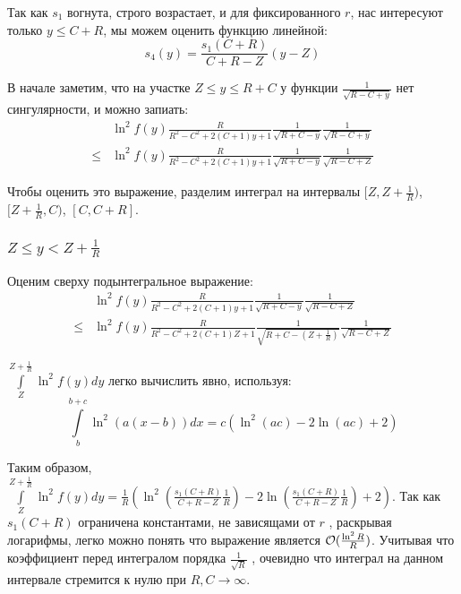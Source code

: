 Так как $s_1$ вогнута, строго возрастает, и для фиксированного $r$, нас интересуют только $y \le C + R$, мы можем оценить функцию линейной: %
\[
s_4(y) = 
\frac{s_1(C + R)}{C + R - Z} (y - Z) %
\]


В начале заметим, что на участке $Z \le y \le R + C$ у функции $\frac{1}{\sqrt{R - C + y}}$ нет сингулярности, и можно запиать:
\begin{align*}
       & \ln^2 f(y) \frac{R}{R^2 - C^2 + 2 (C + 1) y + 1} \frac{1}{\sqrt{R + C - y}} \frac{1}{\sqrt{R - C + y}}
\\ \le & \ln^2 f(y) \frac{R}{R^2 - C^2 + 2 (C + 1) y + 1} \frac{1}{\sqrt{R + C - y}} \frac{1}{\sqrt{R - C + Z}}
\end{align*}

Чтобы оценить это выражение, разделим интеграл на интервалы $[Z, Z + \frac{1}{R})$, $[Z + \frac{1}{R}, C)$, $[C, C + R]$.

\subsubsection{$Z \le y < Z + \frac{1}{R}$}

Оценим сверху подынтегральное выражение:
\begin{align*}
       & \ln^2 f(y) \frac{R}{R^2 - C^2 + 2 (C + 1) y + 1} \frac{1}{\sqrt{R + C - y}} \frac{1}{\sqrt{R - C + Z}}
\\ \le & \ln^2 f(y) \frac{R}{R^2 - C^2 + 2 (C + 1) Z + 1} \frac{1}{\sqrt{R + C - (Z + \frac{1}{R})}} \frac{1}{\sqrt{R - C + Z}}
\end{align*}

$\int\limits_{Z}^{Z + \frac{1}{R}} \ln^2 f(y) dy$ легко вычислить явно, используя:
\[
    \int\limits_b^{b + c} \ln^2 (a (x - b)) dx = c (\ln^2(a c) - 2 \ln (a c) + 2)
\]

Таким образом, $\int\limits_{Z}^{Z + \frac{1}{R}} \ln^2 f(y) dy = \frac{1}{R} ( \ln^2 (\frac{s_1(C + R)}{C + R - Z} \frac{1}{R}) - 2 \ln (\frac{s_1(C + R)}{C + R - Z} \frac{1}{R}) + 2)$. Так как $s_1(C+R)$ ограничена константами, не зависящами от $r$ , раскрывая логарифмы, легко можно понять что выражение является $\mathcal{O}(\frac{\ln^2 R}{R})$. Учитывая что коэффициент перед интегралом  порядка $\frac{1}{\sqrt{R}}$ , очевидно что интеграл на данном интервале стремится к нулю при $R, C \to \infty$.

